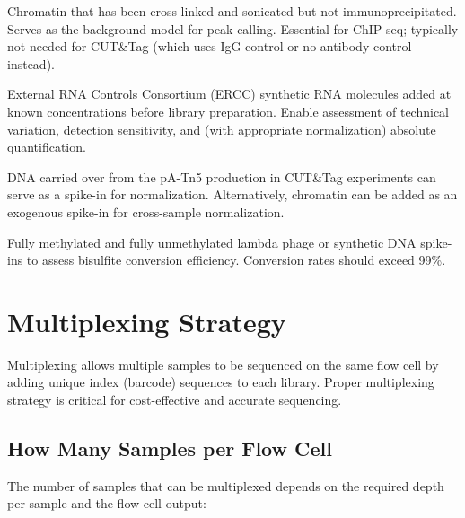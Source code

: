 \begin{description}[style=nextline, font=\bfseries, itemsep=3pt]
  \item[Input control (ChIP-seq)]
  Chromatin that has been cross-linked and sonicated but not immunoprecipitated. Serves as the background model for peak calling. Essential for ChIP-seq; typically not needed for CUT\&Tag (which uses IgG control or no-antibody control instead).

  \item[ERCC spike-ins (RNA-seq)]
  External RNA Controls Consortium (ERCC) synthetic RNA molecules added at known concentrations before library preparation. Enable assessment of technical variation, detection sensitivity, and (with appropriate normalization) absolute quantification.

  \item[Spike-in normalization (CUT\&Tag)]
   DNA carried over from the pA-Tn5 production in CUT\&Tag experiments can serve as a spike-in for normalization. Alternatively,  chromatin can be added as an exogenous spike-in for cross-sample normalization.

  \item[Synthetic methylation standards (WGBS)]
  Fully methylated and fully unmethylated lambda phage or synthetic DNA spike-ins to assess bisulfite conversion efficiency. Conversion rates should exceed 99\%.
\end{description}

\section{Multiplexing Strategy}
\label{sec:expdesign:multiplexing}

Multiplexing allows multiple samples to be sequenced on the same flow cell by adding unique index (barcode) sequences to each library. Proper multiplexing strategy is critical for cost-effective and accurate sequencing.

\subsection{How Many Samples per Flow Cell}

The number of samples that can be multiplexed depends on the required depth per sample and the flow cell output:

